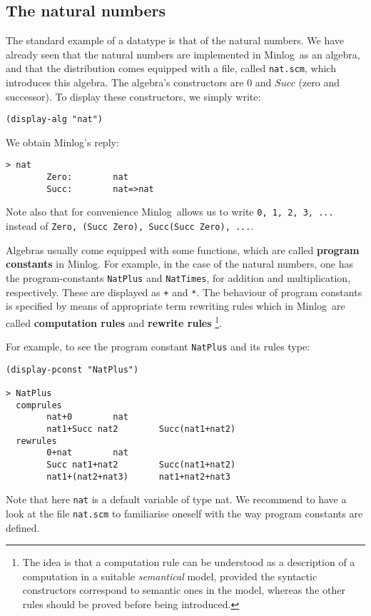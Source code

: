 \documentclass[12pt]{amsart}
\newcommand{\mi}{Minlog}
\begin{document}
\subsection{The natural numbers}
\label{NaturalNumbers}
The standard example of a datatype is that of the natural numbers.  We
have already seen that the natural numbers are implemented in \mi\ as
an algebra, and that the distribution comes equipped with a file,
called \texttt{nat.scm}, which introduces this algebra.  The algebra's
constructors are $0$ and $Succ$ (zero and successor).  To display
these constructors, we simply write:
\begin{verbatim}
(display-alg "nat")
\end{verbatim}
We obtain \mi's reply:
\begin{verbatim}
> nat
        Zero:        nat
        Succ:        nat=>nat
\end{verbatim}

Note also that for convenience \mi\ allows us to write \texttt{0, 1, 2,
  3, ...} instead of \texttt{Zero, (Succ Zero), Succ(Succ Zero), ...}.

Algebras usually come equipped with some functions, which are called
\textbf{program constants} in \mi. For example, in the case of the
natural numbers, one has the program-constants \texttt{NatPlus} and
\texttt{NatTimes}, for addition and multiplication, respectively.
These are displayed as \texttt{+} and \texttt{*}.  The behaviour of
program constants is specified by means of appropriate term rewriting
rules which in \mi\ are called \textbf{computation rules} and
\textbf{rewrite rules} \footnote{The idea is that a computation rule
  can be understood as a description of a computation in a suitable
  \emph{semantical} model, provided the syntactic constructors
  correspond to semantic ones in the model, whereas the other rules
  should be proved before being introduced.}.

For example, to see the program constant \texttt{NatPlus} and its rules
type:
\begin{verbatim}
(display-pconst "NatPlus")

> NatPlus
  comprules
        nat+0        nat
        nat1+Succ nat2        Succ(nat1+nat2)
  rewrules
        0+nat        nat
        Succ nat1+nat2        Succ(nat1+nat2)
        nat1+(nat2+nat3)      nat1+nat2+nat3
\end{verbatim}

Note that here \texttt{nat} is a default variable of type nat.  We
recommend to have a look at the file \texttt{nat.scm} to familiarise
oneself with the way program constants are defined.
\end{document}
